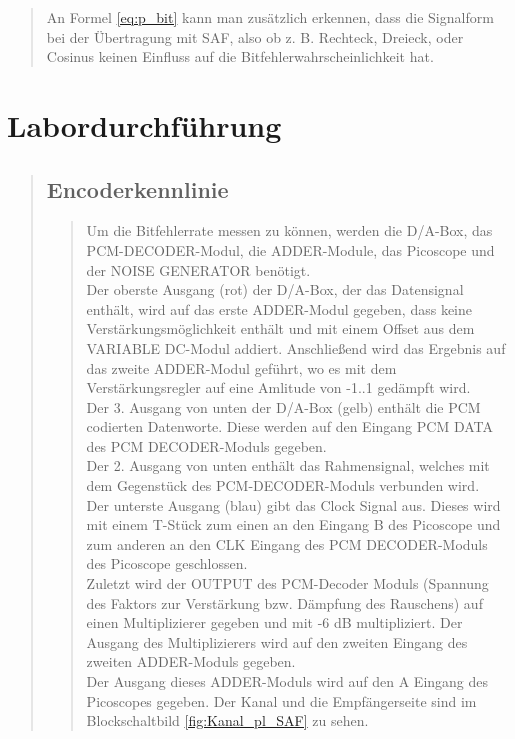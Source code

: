\begin{quote}
	An Formel \ref{eq:p_bit} kann man zusätzlich erkennen, dass die Signalform bei der Übertragung mit SAF, also ob z. B.
	Rechteck, Dreieck, oder Cosinus keinen Einfluss auf die Bitfehlerwahrscheinlichkeit hat.
    
    
\end{quote}


\section{Labordurchführung}
\begin{quote}
    
    
    \subsection{Encoderkennlinie}
    \begin{quote}
        
        Um die Bitfehlerrate messen zu können, werden die D/A-Box, das PCM-DECODER-Modul, die ADDER-Module, das
        Picoscope und der NOISE GENERATOR benötigt.\\
       Der oberste Ausgang (rot) der D/A-Box, der das Datensignal enthält, wird auf das erste ADDER-Modul gegeben, dass
       keine Verstärkungsmöglichkeit enthält und mit einem Offset aus dem VARIABLE DC-Modul addiert. Anschließend wird
       das Ergebnis auf das zweite ADDER-Modul geführt, wo es mit dem Verstärkungsregler auf eine Amlitude von -1..1
       gedämpft wird.\\
       Der 3. Ausgang von unten der D/A-Box (gelb) enthält die PCM codierten Datenworte. Diese werden auf den Eingang
       PCM DATA des PCM DECODER-Moduls gegeben.\\
       Der 2. Ausgang von unten enthält das Rahmensignal, welches mit dem Gegenstück des PCM-DECODER-Moduls verbunden
       wird.\\
       Der unterste Ausgang (blau) gibt das Clock Signal aus. Dieses wird mit einem T-Stück zum einen an den Eingang B
       des Picoscope und zum anderen an den CLK Eingang des PCM DECODER-Moduls des Picoscope geschlossen.\\
       Zuletzt wird der OUTPUT des PCM-Decoder Moduls (Spannung des Faktors zur Verstärkung bzw. Dämpfung des
       Rauschens) auf einen Multiplizierer gegeben und mit -6 dB multipliziert. Der Ausgang des Multiplizierers wird auf den
       zweiten Eingang des zweiten ADDER-Moduls gegeben.\\
       Der Ausgang dieses ADDER-Moduls wird auf den A Eingang des Picoscopes gegeben.
       Der Kanal und die Empfängerseite sind im Blockschaltbild \ref{fig:Kanal_pl_SAF} zu sehen.
       

\end{quote}
\end{quote}
